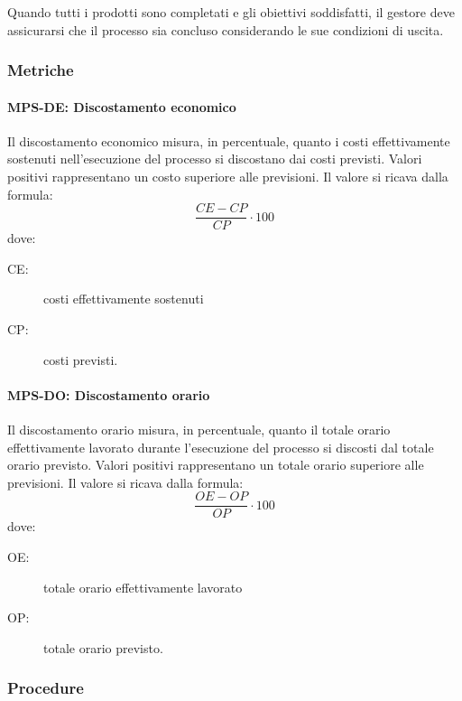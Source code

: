 \documentclass[../../norme-di-progetto.tex]{subfiles}
\begin{document}
Quando tutti i prodotti sono completati e gli obiettivi soddisfatti, il gestore deve assicurarsi che il processo sia concluso considerando le sue condizioni di uscita.

\subsubsection{Metriche}%
\label{subs:gestione-di-processo/metriche}

\paragraph{MPS-DE: Discostamento economico}%
\label{par:MPS-DE_discostamento_economico}

Il discostamento economico misura, in percentuale, quanto i costi effettivamente sostenuti nell'esecuzione del processo si discostano dai costi previsti.
Valori positivi rappresentano un costo superiore alle previsioni.
Il valore si ricava dalla formula:
\begin{equation}
  \frac{CE-CP}{CP}\cdot 100
\end{equation}
dove:
\begin{description}
  \item[CE:] costi effettivamente sostenuti
  \item[CP:] costi previsti.
\end{description}

\paragraph{MPS-DO: Discostamento orario}%
\label{par:MPS-DO_discostamento_orario}

Il discostamento orario misura, in percentuale, quanto il totale orario effettivamente lavorato durante l'esecuzione del processo si discosti dal totale orario previsto.
Valori positivi rappresentano un totale orario superiore alle previsioni.
Il valore si ricava dalla formula:
\begin{equation}
  \frac{OE-OP}{OP}\cdot 100
\end{equation}
dove:
\begin{description}
  \item[OE:] totale orario effettivamente lavorato
  \item[OP:] totale orario previsto.
\end{description}

\subsubsection{Procedure}%
\label{subs:gestione-di-processo/procedure}
\end{document}
